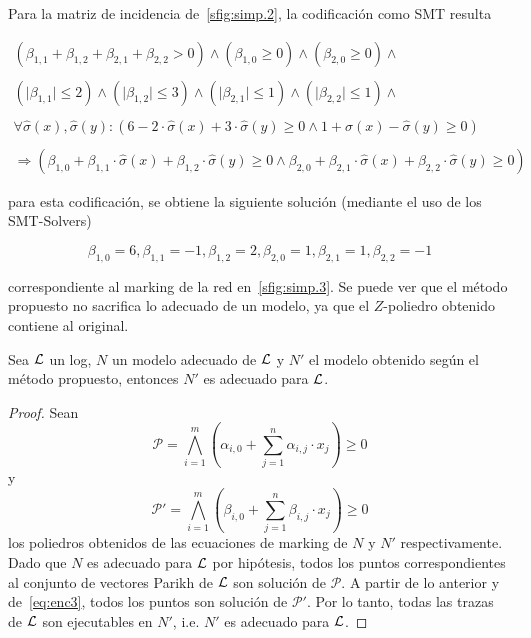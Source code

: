 \begin{example}
Para la matriz de incidencia de~\autoref{sfig:simp.2}, la codificación como SMT resulta

$$\begin{array}{l}
{(\beta_{1,1} + \beta_{1,2} + \beta_{2,1} + \beta_{2,2} > 0)} \land
{(\beta_{1,0} \geq 0)} \land
{(\beta_{2,0} \geq 0)} \land \\ \\
{(\lvert \beta_{1,1} \rvert \leq 2)} \land
{(\lvert \beta_{1,2} \rvert \leq 3)} \land
{(\lvert \beta_{2,1} \rvert \leq 1)} \land
{(\lvert \beta_{2,2} \rvert \leq 1)} \land \\ \\
{\forall \widehat\sigma(x), \widehat\sigma(y) : (6 - 2 \cdot \widehat\sigma(x) + 3 \cdot \widehat\sigma(y) \ge 0 \land 1 + \widehat\sigma(x) - \widehat\sigma(y) \ge 0)} \\ \\
\Rightarrow (\beta_{1,0} + \beta_{1,1} \cdot \widehat\sigma(x) + \beta_{1,2 }\cdot  \widehat\sigma(y) \ge 0 \land \beta_{2,0} + \beta_{2,1} \cdot \widehat\sigma(x) + \beta_{2,2} \cdot  \widehat\sigma(y) \ge 0)
\end{array}$$

para esta codificación, se obtiene la siguiente solución (mediante el uso de los SMT-Solvers)

$$\beta_{1,0}=6,\beta_{1,1}=-1,\beta_{1,2}=2, \beta_{2,0}=1,\beta_{2,1}=1,\beta_{2,2}=-1$$

correspondiente al marking de la red en~\autoref{sfig:simp.3}.
Se puede ver que el método propuesto no sacrifica lo adecuado de un modelo, ya que el $Z$-poliedro obtenido
contiene al original.
\end{example}

\begin{theorem}
    \label{theo:fit}
    Sea ${\mathcal L}$ un log, $N$ un modelo adecuado de ${\mathcal L}$ y $N'$ el modelo obtenido según el método propuesto,
    entonces $N'$ es adecuado para ${\mathcal L}$.
\end{theorem}

\begin{proof}
    Sean $$\mathcal{P} = \bigwedge\limits_{i=1}^m (\alpha_{i,0} + \sum\limits_{j=1}^n \alpha_{i,j} \cdot x_j )\ge 0$$ y
    $$\mathcal{P}' = \bigwedge\limits_{i=1}^m (\beta_{i,0} + \sum\limits_{j=1}^n \beta_{i,j} \cdot x_j )\ge 0$$ los poliedros
    obtenidos de las ecuaciones de marking de $N$ y $N'$ respectivamente. Dado que $N$ es adecuado para ${\mathcal L}$ por hipótesis, 
    todos los puntos correspondientes al conjunto de vectores Parikh de ${\mathcal L}$ son solución de $\mathcal{P}$.
    A partir de lo anterior y de~\eqref{eq:enc3}, todos los puntos son solución de $\mathcal{P}'$.
    Por lo tanto, todas las trazas de ${\mathcal L}$ son ejecutables en $N'$, i.e. $N'$ es adecuado para ${\mathcal L}$.
\end{proof}

